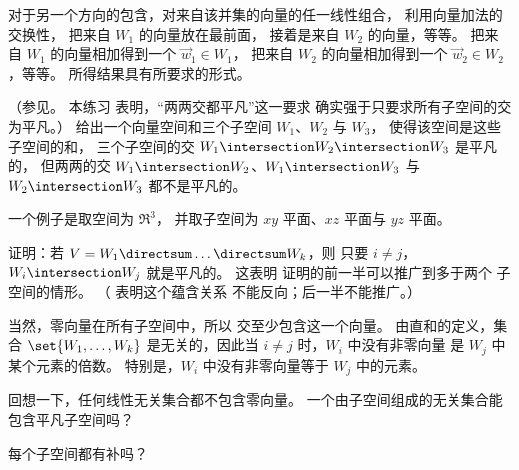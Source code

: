 \begin{exercises}
\begin{answer}
        对于另一个方向的包含，对来自该并集的向量的任一线性组合，
        利用向量加法的交换性，
        把来自 \( W_1 \) 的向量放在最前面，
        接着是来自 \( W_2 \) 的向量，等等。
        把来自 \( W_1 \) 的向量相加得到一个 \( \vec{w}_1\in W_1 \)，
        把来自 \( W_2 \) 的向量相加得到一个 \( \vec{w}_2\in W_2 \)，等等。
        所得结果具有所要求的形式。
      \end{answer}
  \item \label{exer:ThreeSubsPairwseNonTriv}
    （参见。
    本练习
    表明，“两两交都平凡”这一要求
    确实强于只要求所有子空间的交为平凡。）
    给出一个向量空间和三个子空间 $W_1$、$W_2$ 与 $W_3$，
    使得该空间是这些子空间的和，
    三个子空间的交
    $W_1\intersection W_2\intersection W_3$ 是平凡的，
    但两两的交
    $W_1\intersection W_2$、$W_1\intersection W_3$ 与 $W_2\intersection W_3$
    都不是平凡的。
    \begin{answer}
      一个例子是取空间为 $\Re^3$，
      并取子空间为 $xy$ 平面、$xz$ 平面与 $yz$ 平面。
    \end{answer}
  \item 
    证明：若 \( V=W_1\directsum\dots\directsum W_k \)，则
    只要 \( i\neq j \)，\( W_i\intersection W_j \) 就是平凡的。
    这表明
    证明的前一半可以推广到多于两个
    子空间的情形。
    （ 表明这个蕴含关系
    不能反向；后一半不能推广。）
    \begin{answer}
      当然，零向量在所有子空间中，所以
      交至少包含这一个向量。  
      由直和的定义，集合
      \( \set{W_1,\dots,W_k} \) 是无关的，因此当
      \( i\neq j \) 时，\( W_i \) 中没有非零向量
      是 \( W_j \) 中某个元素的倍数。
      特别是，\( W_i \) 中没有非零向量等于
      \( W_j \) 中的元素。
    \end{answer}
  \item 
    回想一下，任何线性无关集合都不包含零向量。
    一个由子空间组成的无关集合能包含平凡子空间吗？
  \recommended \item 
    每个子空间都有补吗？

\end{exercises}
